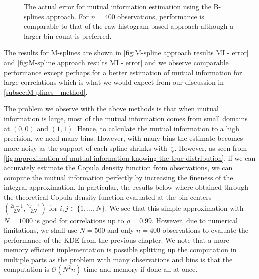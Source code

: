 \documentclass[../Thesis.tex]{subfiles}
\begin{document}
\begin{figure}[H]
\begin{subfigure}[t]{0.4\textwidth}
        \caption{}
    \end{subfigure}
    \caption{The actual error for mutual information estimation using the B-splines approach. For $n=400$ observations, performance is comparable to that of the raw histogram based approach although a larger bin count is preferred.}
    \label{fig:B-spline approach results MI - error}
\end{figure}
The results for M-splines are shown in \autoref{fig:M-spline approach results MI - error} and \autoref{fig:M-spline approach results MI - error} and we observe comparable performance except perhaps for a better estimation of mutual information for large correlations which is what we would expect from our discussion in \autoref{subsec:M-plines - method}.

The problem we observe with the above methods is that when mutual information is large, most of the mutual information comes from small domains at $(0,0)$ and $(1,1)$. Hence, to calculate the mutual information to a high precision, we need many bins. However, with many bins the estimate becomes more noisy as the support of each spline shrinks with $\frac{1}{N}$. However, as seen from \autoref{fig:approximation of mutual information knowing the true distribution}, if we can accurately estimate the Copula density function from observations, we can compute the mutual information perfectly by increasing the fineness of the integral approximation. In particular, the results below where obtained through the theoretical Copula density function evaluated at the bin centers $\left(\frac{2i - 1}{2N}, \frac{2j - 1}{2N}\right)$ for $i,j \in \{1,\dots, N\}$. We see that this simple approximation with $N = 1000$ is good for correlations up to $\rho = 0.99$. However, due to numerical limitations, we shall use $N = 500$ and only $n = 400$ observations to evaluate the performance of the KDE from the previous chapter. We note that a more memory efficient implementation is possible splitting up the computation in multiple parts as the problem with many observations and bins is that the computation is $\mathcal{O}\left(N^2n\right)$ time and memory if done all at once.
\end{document}

